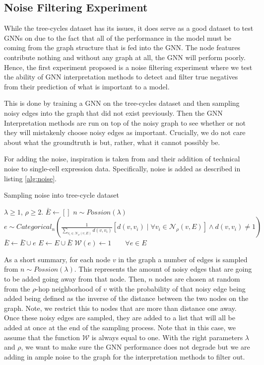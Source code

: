 \subsection{Noise Filtering Experiment}
While the tree-cycles dataset has its issues, it does serve as a good dataset to test GNNs on due to the fact that all of the performance in the model must be coming from the graph structure that is fed into the GNN. The node features contribute nothing and without any graph at all, the GNN will perform poorly. Hence, the first experiment proposed is a noise filtering experiment where we test the ability of GNN interpretation methods to detect and filter true negatives from their prediction of what is important to a model.

This is done by training a GNN on the tree-cycles dataset and then sampling noisy edges into the graph that did not exist previously. Then the GNN Interpretation methods are run on top of the noisy graph to see whether or not they will mistakenly choose noisy edges as important. Crucially, we do not care about what the groundtruth is but, rather, what it cannot possibly be. 

For adding the noise, inspiration is taken from \cite{dibaeinia_sergio_2020} and their addition of technical noise to single-cell expression data. Specifically, noise is added as described in listing \ref{alg:noise}.
\begin{algorithm}[h]
	\centering
	\caption{Sampling noise into tree-cycle dataset}
	\label{alg:noise}
	\begin{algorithmic}
		\Require $\lambda \geq 1$, $\rho \geq 2$.
		\State $\bar{E} \gets []$
			\State $n \sim Possion(\lambda)$
			\State $e \sim Categorical_n\left(\frac{1}{\sum_{v_i \in \mathcal{N}_{\rho}(v, E)}d(v, v_i)}[d(v, v_i) \mid \forall v_i \in \mathcal{N}_{\rho}(v, E)] \wedge d(v, v_i) \neq 1 \right)$
			\State $\bar{E} \gets \bar{E} \cup e$
		\EndFor
		\State $E \gets E \cup \bar{E}$
		\State $\mathcal{W}(e) \gets 1 \quad\quad \forall e \in E$
	\end{algorithmic}
\end{algorithm}
As a short summary, for each node $v$ in the graph a number of edges is sampled from $n \sim Possion(\lambda)$. This represents the amount of noisy edges that are going to be added going away from that node. Then, $n$ nodes are chosen at random from the $\rho$-hop neighborhood of $v$ with the probability of that noisy edge being added being defined as the inverse of the distance between the two nodes on the graph. Note, we restrict this to nodes that are more than distance one away. Once these noisy edges are sampled, they are added to a list that will all be added at once at the end of the sampling process. Note that in this case, we assume that the function $\mathcal{W}$ is always equal to one. With the right parameters $\lambda$ and $\rho$, we want to make sure the GNN performance does not degrade but we are adding in ample noise to the graph for the interpretation methods to filter out.


